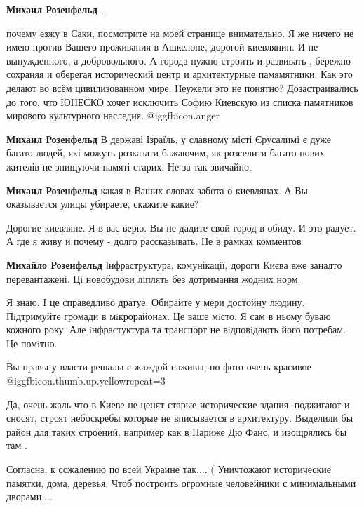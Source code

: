 \begin{itemize}
\begin{itemize} %
\textbf{Михаил Розенфельд} ,

почему езжу в Саки, посмотрите на моей странице внимательно. Я же ничего не
имею против Вашего проживания в Ашкелоне, дорогой киевлянин. И не вынужденного,
а добровольного. А города нужно строить и развивать , бережно сохраняя и
оберегая исторический центр и архитектурные памямятники. Как это делают во всём
цивилизованном мире. Неужели это не понятно? Дозастраивались до того, что
ЮНЕСКО хочет исключить Софию Киевскую из списка памятников мирового культурного
наследия. @igg{fbicon.anger} 

\textbf{Михаил Розенфельд} В державі Ізраїль, у славному місті Єрусалимі є дуже багато людей, які можуть розказати бажаючим, як розселити багато нових жителів не знищуючи памяті старих. Не за так звичайно.

\textbf{Михаил Розенфельд} какая в Ваших словах забота о киевлянах. А Вы оказывается улицы убираете, скажите какие?

Дорогие киевляне. Я в вас верю. Вы не дадите свой город в обиду. И это радует. А где я живу и почему - долго рассказывать. Не в рамках комментов

\textbf{Михайло Розенфельд} Інфраструктура, комунікації, дороги Києва вже занадто перевантажені.
Ці новобудови ліплять без дотримання жодних норм.


Я знаю. I це справедливо дратуе. Обирайте у мери достойну людину. Пiдтримуйте
громади в мiкрорайонах. Це ваше мiсто. Я сам в ньому буваю кожного року. Але
iнфрастуктура та транспорт не вiдповiдають його потребам. Це помiтно.

\end{itemize} %

Вы правы у власти решалы с жаждой наживы, но фото очень красивое  @igg{fbicon.thumb.up.yellow}{repeat=3} 


Да, очень жаль что в Киеве не ценят старые исторические здания, поджигают и
сносят, строят небоскребы которые не вписывается в архитектуру. Выделили бы
район для таких строений, например как в Париже Дю Фанс, и изощрялись бы там .


Согласна, к сожалению по всей Украине так.... ( Уничтожают исторические
памятки, дома, деревья. Чтоб построить огромные человейники с минимальными
дворами....


\end{itemize}
